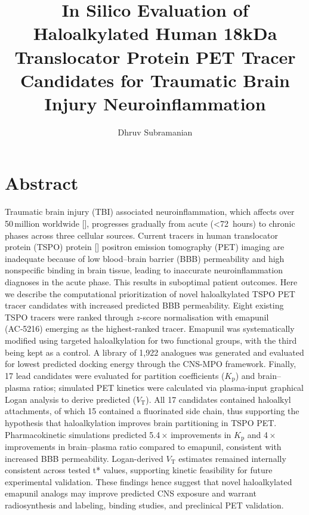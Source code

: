 \documentclass[times, twoside]{zHenriquesLab-StyleBioRxiv}
\begin{document}
		
		\title{In Silico Evaluation of Haloalkylated Human 18kDa Translocator Protein PET Tracer Candidates for Traumatic Brain Injury Neuroinflammation}
		
		\author[1,\Letter]{Dhruv Subramanian}
		
		
		\maketitle
		
		\section*{Abstract}
		Traumatic brain injury (TBI) associated neuroinflammation, which affects over 50\,million worldwide [\cite{galgano2017}], progresses gradually from acute (<72~hours) to chronic phases across three cellular sources.  Current tracers in human translocator protein (TSPO) protein [\cite{scarf2011}] positron emission tomography (PET) imaging are inadequate because of low blood–brain barrier (BBB) permeability and high nonspecific binding in brain tissue, leading to inaccurate neuroinflammation diagnoses in the acute phase.  This results in suboptimal patient outcomes.  Here we describe the computational prioritization of novel haloalkylated TSPO PET tracer candidates with increased predicted BBB permeability.  Eight existing TSPO tracers were ranked through $z$-score normalisation with emapunil (AC‑5216) emerging as the highest‑ranked tracer.  Emapunil was systematically modified using targeted haloalkylation for two functional groups, with the third being kept as a control.  A library of 1,922 analogues was generated and evaluated for lowest predicted docking energy through the CNS-MPO framework.  Finally, 17 lead candidates were evaluated for partition coefficients ($K_{\mathrm{p}}$) and brain–plasma ratios; simulated PET kinetics were calculated via plasma‑input graphical Logan analysis to derive predicted ($V_{\mathrm{T}}$).  All 17 candidates contained haloalkyl attachments, of which 15 contained a fluorinated side chain, thus supporting the hypothesis that haloalkylation improves brain partitioning in TSPO PET.  Pharmacokinetic simulations predicted 5.4\,\ensuremath{\times} improvements in $K_{\mathrm{p}}$ and 4\,\ensuremath{\times} improvements in brain–plasma ratio compared to emapunil, consistent with increased BBB permeability. Logan-derived $V_{\mathrm{T}}$ estimates remained internally consistent across tested t* values, supporting kinetic feasibility for future experimental validation. These findings hence suggest that novel haloalkylated emapunil analogs may improve predicted CNS exposure and warrant radiosynthesis and labeling, binding studies, and preclinical PET validation.
\end{document}
